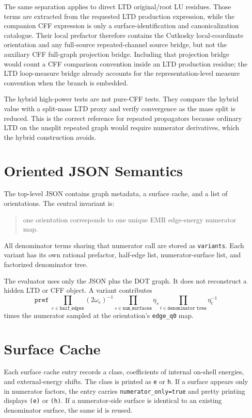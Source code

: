 \documentclass[11pt,a4paper]{report}
\begin{document}
The same separation applies to direct LTD original/root LU residues.  Those
terms are extracted from the requested LTD production expression, while the
companion CFF expression is only a surface-identification and canonicalization
catalogue.  Their local prefactor therefore contains the Cutkosky
local-coordinate orientation and any full-source repeated-channel source
bridge, but not the auxiliary CFF full-graph projection bridge.  Including that
projection bridge would count a CFF comparison convention inside an LTD
production residue; the LTD loop-measure bridge already accounts for the
representation-level measure convention when the branch is embedded.

The hybrid high-power tests are not pure-CFF tests.  They compare the hybrid
value with a split-mass LTD proxy and verify convergence as the mass split is
reduced.  This is the correct reference for repeated propagators because
ordinary LTD on the unsplit repeated graph would require numerator
derivatives, which the hybrid construction avoids.

\section{Oriented JSON Semantics}

The top-level JSON contains graph metadata, a surface cache, and a list of
orientations.  The central invariant is:
\begin{quote}
one orientation corresponds to one unique EMR edge-energy numerator map.
\end{quote}
All denominator terms sharing that numerator call are stored as
\texttt{variants}.  Each variant has its own rational prefactor, half-edge
list, numerator-surface list, and factorized denominator tree.

The evaluator uses only the JSON plus the DOT graph.  It does not reconstruct a
hidden LTD or CFF object.  A variant contributes
\[
  \texttt{pref}\;
  \prod_{e\in\texttt{half\_edges}}(2\omega_e)^{-1}
  \prod_{s\in\texttt{num\_surfaces}}\eta_s
  \prod_{t\in\texttt{denominator tree}}\eta_t^{-1}
\]
times the numerator sampled at the orientation's \texttt{edge\_q0} map.

\section{Surface Cache}

Each surface cache entry records a class, coefficients of internal on-shell
energies, and external-energy shifts.  The class is printed as
\texttt{e} or \texttt{h}.  If a surface appears only in numerator factors, the
entry carries \texttt{numerator\_only=true} and pretty printing displays
\texttt{(e)} or \texttt{(h)}.  If a numerator-side surface is identical to an
existing denominator surface, the same id is reused.
\end{document}
